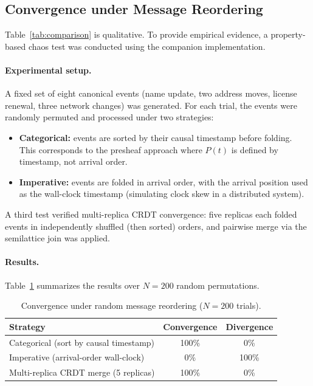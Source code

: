 \documentclass[11pt,a4paper]{article}
\begin{document}
\subsection{Convergence under Message Reordering}
\label{sec:convergence}

Table~\ref{tab:comparison} is qualitative. To provide empirical evidence,
a property-based chaos test was conducted using the companion implementation.

\paragraph{Experimental setup.}
A fixed set of eight canonical events (name update, two address moves,
license renewal, three network changes) was generated. For each trial,
the events were randomly permuted and processed under two strategies:

\begin{itemize}
  \item \textbf{Categorical:} events are sorted by their causal timestamp
    before folding. This corresponds to the presheaf approach where
    $P(t)$ is defined by timestamp, not arrival order.
  \item \textbf{Imperative:} events are folded in arrival order, with
    the arrival position used as the wall-clock timestamp (simulating
    clock skew in a distributed system).
\end{itemize}

\noindent
A third test verified multi-replica CRDT convergence: five replicas
each folded events in independently shuffled (then sorted) orders, and
pairwise merge via the semilattice join was applied.

\paragraph{Results.}
Table~\ref{tab:chaos} summarizes the results over $N=200$ random
permutations.

\begin{table}[ht]
\centering
\caption{Convergence under random message reordering ($N=200$ trials).}
\label{tab:chaos}
\begin{tabular}{@{}lcc@{}}
\toprule
\textbf{Strategy} & \textbf{Convergence} & \textbf{Divergence} \\
\midrule
Categorical (sort by causal timestamp) & 100\% & 0\% \\
Imperative (arrival-order wall-clock) & 0\% & 100\% \\
Multi-replica CRDT merge (5 replicas) & 100\% & 0\% \\
\bottomrule
\end{tabular}
\end{table}
\end{document}
